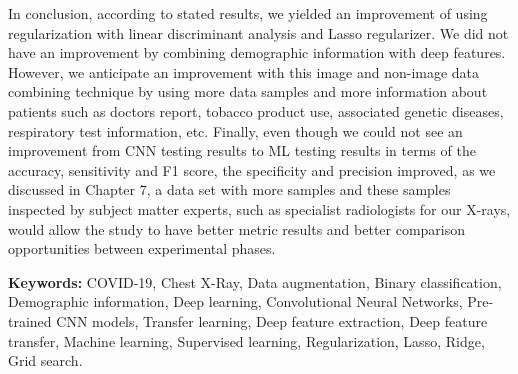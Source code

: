 In conclusion, according to stated results, we yielded an improvement of using regularization with linear discriminant analysis and Lasso regularizer. We did not have an improvement by combining demographic information with deep features. However, we anticipate an improvement with this image and non-image data combining technique by using more data samples and more information about patients such as doctors report, tobacco product use, associated genetic diseases, respiratory test information, etc. Finally, even though we could not see an improvement from CNN testing results to ML testing results in terms of the accuracy, sensitivity and F1 score, the specificity and precision improved, as we discussed in Chapter 7, a data set with more samples and these samples inspected by subject matter experts, such as specialist radiologists for our X-rays, would allow the study to have better metric results and better comparison opportunities between experimental phases.

\textbf{Keywords:} COVID-19, Chest X-Ray, Data augmentation, Binary classification, Demographic information, Deep learning, Convolutional Neural Networks, Pre-trained CNN models, Transfer learning, Deep feature extraction, Deep feature transfer, Machine learning, Supervised learning, Regularization, Lasso, Ridge, Grid search.